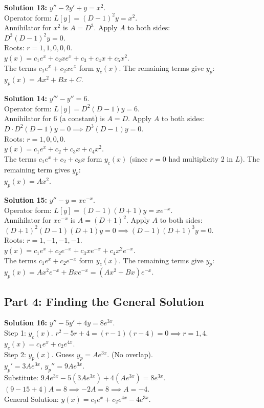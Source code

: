 \documentclass[11pt]{article}
\begin{document}
\textbf{Solution 13:} $y'' - 2y' + y = x^2$. \\
Operator form: $L[y] = (D-1)^2 y = x^2$. \\
Annihilator for $x^2$ is $A = D^3$. Apply $A$ to both sides: \\
$D^3(D-1)^2 y = 0$. \\
Roots: $r = 1, 1, 0, 0, 0$. \\
$y(x) = c_1 e^x + c_2 x e^x + c_3 + c_4 x + c_5 x^2$. \\
The terms $c_1 e^x + c_2 x e^x$ form $y_c(x)$. The remaining terms give $y_p$: \\
$y_p(x) = A x^2 + B x + C$.

\textbf{Solution 14:} $y''' - y'' = 6$. \\
Operator form: $L[y] = D^2(D-1)y = 6$. \\
Annihilator for $6$ (a constant) is $A = D$. Apply $A$ to both sides: \\
$D \cdot D^2(D-1)y = 0 \implies D^3(D-1)y = 0$. \\
Roots: $r = 1, 0, 0, 0$. \\
$y(x) = c_1 e^x + c_2 + c_3 x + c_4 x^2$. \\
The terms $c_1 e^x + c_2 + c_3 x$ form $y_c(x)$ (since $r=0$ had multiplicity 2 in $L$). The remaining term gives $y_p$: \\
$y_p(x) = A x^2$.

\textbf{Solution 15:} $y'' - y = x e^{-x}$. \\
Operator form: $L[y] = (D-1)(D+1)y = x e^{-x}$. \\
Annihilator for $x e^{-x}$ is $A = (D+1)^2$. Apply $A$ to both sides: \\
$(D+1)^2(D-1)(D+1)y = 0 \implies (D-1)(D+1)^3 y = 0$. \\
Roots: $r = 1, -1, -1, -1$. \\
$y(x) = c_1 e^x + c_2 e^{-x} + c_3 x e^{-x} + c_4 x^2 e^{-x}$. \\
The terms $c_1 e^x + c_2 e^{-x}$ form $y_c(x)$. The remaining terms give $y_p$: \\
$y_p(x) = A x^2 e^{-x} + B x e^{-x} = (Ax^2 + Bx)e^{-x}$.

\subsection*{Part 4: Finding the General Solution}

\textbf{Solution 16:} $y'' - 5y' + 4y = 8e^{3x}$. \\
Step 1: $y_c(x)$. $r^2 - 5r + 4 = (r-1)(r-4) = 0 \implies r=1, 4$. $y_c(x) = c_1 e^x + c_2 e^{4x}$. \\
Step 2: $y_p(x)$. Guess $y_p = A e^{3x}$. (No overlap). \\
$y_p' = 3A e^{3x}$, $y_p'' = 9A e^{3x}$. \\
Substitute: $9A e^{3x} - 5(3A e^{3x}) + 4(A e^{3x}) = 8e^{3x}$. \\
$(9 - 15 + 4)A = 8 \implies -2A = 8 \implies A = -4$. \\
General Solution: $y(x) = c_1 e^x + c_2 e^{4x} - 4e^{3x}$.
\end{document}
